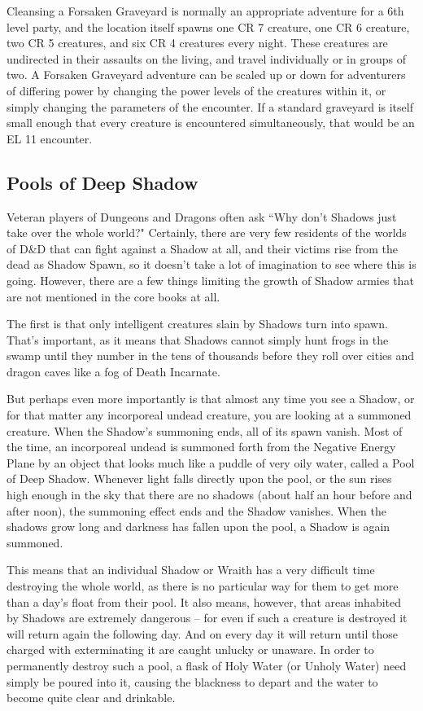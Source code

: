 Cleansing a Forsaken Graveyard is normally an appropriate adventure for a 6th level party, and the location itself spawns one CR 7 creature, one CR 6 creature, two CR 5 creatures, and six CR 4 creatures every night. These creatures are undirected in their assaults on the living, and travel individually or in groups of two. A Forsaken Graveyard adventure can be scaled up or down for adventurers of differing power by changing the power levels of the creatures within it, or simply changing the parameters of the encounter. If a standard graveyard is itself small enough that every creature is encountered simultaneously, that would be an EL 11 encounter.

\subsection{Pools of Deep Shadow}

Veteran players of Dungeons and Dragons often ask ``Why don't Shadows just take over the whole world?" Certainly, there are very few residents of the worlds of D\&D that can fight against a Shadow at all, and their victims rise from the dead as Shadow Spawn, so it doesn't take a lot of imagination to see where this is going. However, there are a few things limiting the growth of Shadow armies that are not mentioned in the core books at all.

The first is that only intelligent creatures slain by Shadows turn into spawn. That's important, as it means that Shadows cannot simply hunt frogs in the swamp until they number in the tens of thousands before they roll over cities and dragon caves like a fog of Death Incarnate.

But perhaps even more importantly is that almost any time you see a Shadow, or for that matter any incorporeal undead creature, you are looking at a summoned creature. When the Shadow's summoning ends, all of its spawn vanish. Most of the time, an incorporeal undead is summoned forth from the Negative Energy Plane by an object that looks much like a puddle of very oily water, called a Pool of Deep Shadow. Whenever light falls directly upon the pool, or the sun rises high enough in the sky that there are no shadows (about half an hour before and after noon), the summoning effect ends and the Shadow vanishes. When the shadows grow long and darkness has fallen upon the pool, a Shadow is again summoned.

This means that an individual Shadow or Wraith has a very difficult time destroying the whole world, as there is no particular way for them to get more than a day's float from their pool. It also means, however, that areas inhabited by Shadows are extremely dangerous -- for even if such a creature is destroyed it will return again the following day. And on every day it will return until those charged with exterminating it are caught unlucky or unaware. In order to permanently destroy such a pool, a flask of Holy Water (or Unholy Water) need simply be poured into it, causing the blackness to depart and the water to become quite clear and drinkable.

